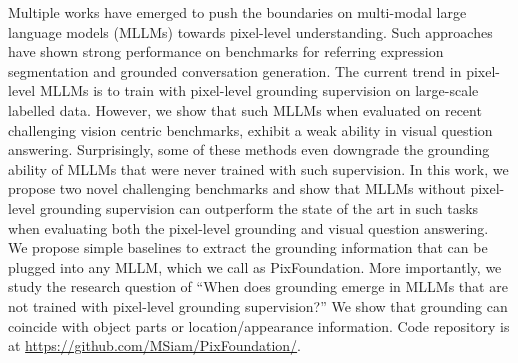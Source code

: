 Multiple works have emerged to push the boundaries on multi-modal large language models (MLLMs) towards pixel-level understanding. Such approaches have shown strong performance on benchmarks for referring expression segmentation and grounded conversation generation. The current trend in pixel-level MLLMs is to train with pixel-level grounding supervision on large-scale labelled data. However, we show that such MLLMs when evaluated on recent challenging vision centric benchmarks, exhibit a weak ability in visual question answering. Surprisingly, some of these methods even downgrade the grounding ability of MLLMs that were never trained with such supervision. In this work, we propose two novel challenging benchmarks and show that MLLMs without pixel-level grounding supervision can outperform the state of the art in such tasks when evaluating both the pixel-level grounding and visual question answering. We propose simple baselines to extract the grounding information that can be plugged into any MLLM, which we call as PixFoundation. More importantly, we study the research question of ``When does grounding emerge in MLLMs that are not trained with pixel-level grounding supervision?'' We show that grounding can coincide with object parts or location/appearance information. Code repository is at \url{https://github.com/MSiam/PixFoundation/}.